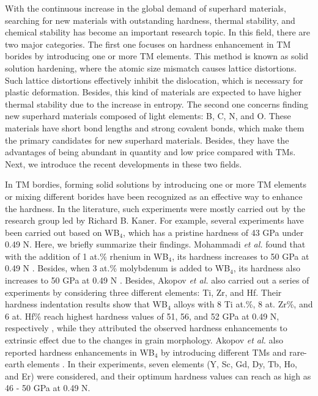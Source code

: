 \vspace{24pt}

With the continuous increase in the global demand of superhard materials, searching for new materials with outstanding hardness, thermal stability, and chemical stability has become an important research topic. In this field, there are two major categories. The first one focuses on hardness enhancement in TM borides by introducing one or more TM elements. This method is known as solid solution hardening, where the atomic size mismatch causes lattice distortions. Such lattice distortions effectively inhibit the dislocation, which is necessary for plastic deformation. Besides, this kind of materials are expected to have higher thermal stability due to the increase in entropy. The second one concerns finding new superhard materials composed of light elements: B, C, N, and O. These materials have short bond lengths and strong covalent bonds, which make them the primary candidates for new superhard materials. Besides, they have the advantages of being abundant in quantity and low price compared with TMs. Next, we introduce the recent developments in these two fields.


In TM bordies, forming solid solutions by introducing one or more TM elements or mixing different borides have been recognized as an effective way to enhance the hardness. In the literature, such experiments were mostly carried out by the research group led by Richard B. Kaner. For example, several experiments have been carried out based on WB$_4$, which has a pristine hardness of 43 GPa under 0.49 N. Here, we briefly summarize their findings. Mohammadi {\it et al.} found that with the addition of 1 at.\% rhenium in WB$_4$, its hardness increases to 50 GPa at 0.49 N \cite{WB4_mohammadi2011tungsten}. Besides, when 3 at.\% molybdenum is added to WB$_4$, its hardness also increases to 50 GPa at 0.49 N \cite{WB4_Mo_H_enhancement}. Besides, Akopov {\it et al.} also carried out a series of experiments by considering three different elements: Ti, Zr, and Hf. Their hardness indentation results show that WB$_4$ alloys with 8 Ti at.\%, 8 at. Zr\%, and 6 at. Hf\% reach highest hardness values of 51, 56, and 52 GPa at 0.49 N, respectively \cite{WB4_akopov2016extrinsic}, while they attributed the observed hardness enhancements to extrinsic effect due to the changes in grain morphology. Akopov {\it et al.} also reported hardness enhancements in WB$_4$ by introducing different TMs and rare-earth elements \cite{akopov2018effects}. In their experiments, seven elements (Y, Sc, Gd, Dy, Tb, Ho, and Er) were considered, and their optimum hardness values can reach as high as 46 - 50 GPa at 0.49 N.

